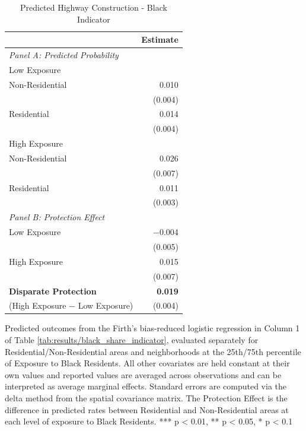 \begin{table}[h]
\centering
\caption{Predicted Highway Construction - Black Indicator}
\label{tab:predicted_outcomes/black_share_indicator}
\begin{threeparttable}
\begin{tabular*}{1\textwidth}{@{\extracolsep{\fill}}lr@{\hspace{1.2em}}}
\toprule
 & Estimate \\
\midrule
\textit{Panel A: Predicted Probability} & \\
\addlinespace[2pt]
Low Exposure & \\
\quad Non-Residential & 0.010 \\
 & (0.004) \\[4pt]
\quad Residential & 0.014 \\
 & (0.004) \\[4pt]
High Exposure & \\
\quad Non-Residential & 0.026 \\
 & (0.007) \\[4pt]
\quad Residential & 0.011 \\
 & (0.003) \\[4pt]
\midrule
\textit{Panel B: Protection Effect} & \\
\addlinespace[2pt]
Low Exposure & $-$0.004 \\
 & (0.005) \\[4pt]
High Exposure & 0.015\rlap{$^{**}$} \\
 & (0.007) \\[4pt]
\addlinespace[2pt]
\textbf{Disparate Protection} & \textbf{0.019}\rlap{$^{***}$} \\
(High Exposure $-$ Low Exposure) & (0.004) \\
\bottomrule
\end{tabular*}
\begin{tablenotes}[flushleft]
\footnotesize
\item Predicted outcomes from the Firth's bias-reduced logistic regression in Column 1 of Table \ref{tab:results/black_share_indicator}, evaluated separately for Residential/Non-Residential areas and neighborhoods at the 25th/75th percentile of Exposure to Black Residents. All other covariates are held constant at their own values and reported values are averaged across observations and can be interpreted as average marginal effects. Standard errors are computed via the delta method from the spatial covariance matrix. The Protection Effect is the difference in predicted rates between Residential and Non-Residential areas at each level of exposure to Black Residents. *** p < 0.01, ** p < 0.05, * p < 0.1
\end{tablenotes}
\end{threeparttable}
\end{table}
